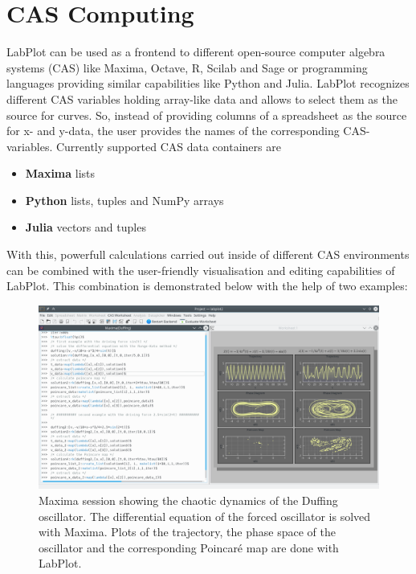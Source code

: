 \chapter{CAS Computing}\label{ch:cas_computing}
LabPlot can be used as a frontend to different open-source computer algebra systems (CAS) like Maxima, Octave, R, Scilab and Sage  or programming languages providing similar capabilities like Python and Julia. LabPlot recognizes different CAS variables holding array-like data and allows to select them as the source for curves. So, instead of providing columns of a spreadsheet as the source for x- and y-data, the user provides the names of the corresponding CAS-variables. Currently supported CAS data containers are
\begin{itemize}
\item \textbf{Maxima} lists
\item \textbf{Python} lists, tuples and NumPy arrays
\item \textbf{Julia} vectors and tuples
\end{itemize}

With this, powerfull calculations carried out inside of different CAS environments can be combined with the user-friendly visualisation and editing capabilities of LabPlot. This combination is demonstrated below with the help of two examples:
\begin{figure}
\includegraphics[width=\textwidth]{images/maxima_session.png}
\caption{Maxima session showing the chaotic dynamics of the Duffing oscillator. The differential equation of the forced oscillator is solved with Maxima. Plots of the trajectory, the phase space of the oscillator and the corresponding Poincaré map are done with LabPlot.}
\end{figure}

